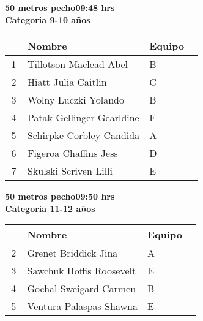 \begin{minipage}{0.95\linewidth}\vspace{0.5cm} 
\begin{flushleft}
\textbf{
\hspace{-0.15cm}50 metros pecho\hspace{1.5cm}09:48 hrs \\Categoria 9-10 años}\vspace{-0.2cm} 
\end{flushleft}
\begin{tabular}{cp{0.63\linewidth}l}
\hline
& \textbf{Nombre} & \textbf{Equipo} \\ \hline
1 & Tillotson Maclead Abel & B \\ 
2 & Hiatt Julia Caitlin & C \\ 
3 & Wolny Luczki Yolando & B \\ 
4 & Patak Gellinger Gearldine & F \\ 
5 & Schirpke Corbley Candida & A \\ 
6 & Figeroa Chaffins Jess & D \\ 
7 & Skulski Scriven Lilli & E \\ 
\end{tabular}
\end{minipage}
\begin{minipage}{0.95\linewidth}\vspace{0.5cm} 
\begin{flushleft}
\textbf{
\hspace{-0.15cm}50 metros pecho\hspace{1.5cm}09:50 hrs \\Categoria 11-12 años}\vspace{-0.2cm} 
\end{flushleft}
\begin{tabular}{cp{0.63\linewidth}l}
\hline
& \textbf{Nombre} & \textbf{Equipo} \\ \hline
2 & Grenet Briddick Jina & A \\ 
3 & Sawchuk Hoffis Roosevelt & E \\ 
4 & Gochal Sweigard Carmen & B \\ 
5 & Ventura Palaspas Shawna & E \\ 
\end{tabular}
\end{minipage}
